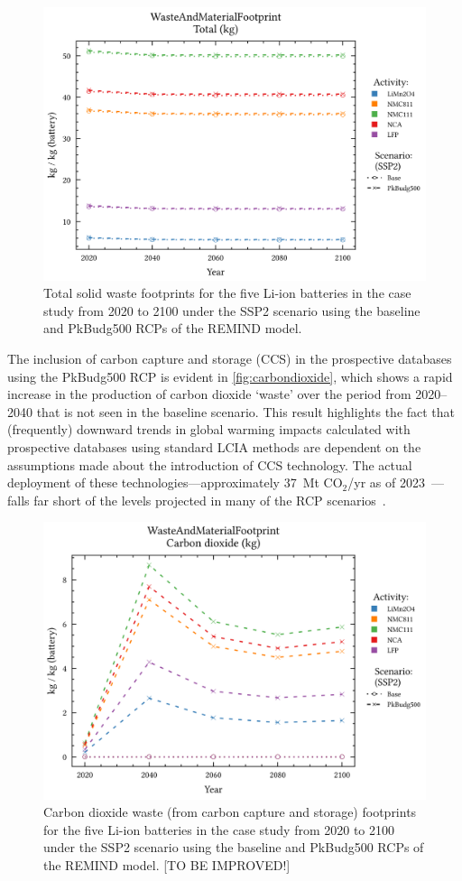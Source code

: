 \begin{figure}[H]
    \centering
    \includegraphics[width=0.7\linewidth]{figures/total_waste.png}
    \caption{Total solid waste footprints for the five Li-ion batteries in the case study from 2020 to 2100 under the SSP2 scenario using the baseline and PkBudg500 RCPs of the REMIND model.}\label{fig:waste_total}
\end{figure}

The inclusion of carbon capture and storage (CCS) in the prospective databases using the PkBudg500 RCP is evident in \autoref{fig:carbondioxide}, which shows a rapid increase in the production of carbon dioxide `waste' over the period from 2020--2040 that is not seen in the baseline scenario. This result highlights the fact that (frequently) downward trends in global warming impacts calculated with prospective databases using standard LCIA methods are dependent on the assumptions made about the introduction of CCS technology. The actual deployment of these technologies---approximately 37~Mt CO$_2$/yr as of 2023~\citep{dziejarski2023ccs}---falls far short of the levels projected in many of the RCP scenarios~\citep{sacchi2023premisedocs}.  

\begin{figure}[H]
    \centering
    \includegraphics[width=0.7\linewidth]{figures/carbondioxide.png}
    \caption{Carbon dioxide waste (from carbon capture and storage) footprints for the five Li-ion batteries in the case study from 2020 to 2100 under the SSP2 scenario using the baseline and PkBudg500 RCPs of the REMIND model. [TO BE IMPROVED!]}\label{fig:carbondioxide}
\end{figure}

